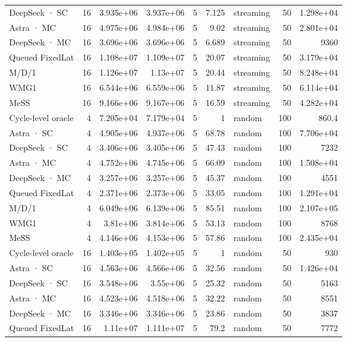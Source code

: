 \begin{tabular}{lrrrrrlrr}
DeepSeek · SC & 16 & 3.935e+06 & 3.937e+06 & 5 & 7.125 & streaming & 50 & 1.298e+04 \\
Astra · MC & 16 & 4.975e+06 & 4.984e+06 & 5 & 9.02 & streaming & 50 & 2.801e+04 \\
DeepSeek · MC & 16 & 3.696e+06 & 3.696e+06 & 5 & 6.689 & streaming & 50 & 9360 \\
Queued FixedLat & 16 & 1.108e+07 & 1.109e+07 & 5 & 20.07 & streaming & 50 & 3.179e+04 \\
M/D/1 & 16 & 1.126e+07 & 1.13e+07 & 5 & 20.44 & streaming & 50 & 8.248e+04 \\
WMG1 & 16 & 6.544e+06 & 6.559e+06 & 5 & 11.87 & streaming & 50 & 6.114e+04 \\
MeSS & 16 & 9.166e+06 & 9.167e+06 & 5 & 16.59 & streaming & 50 & 4.282e+04 \\
Cycle-level oracle & 4 & 7.205e+04 & 7.179e+04 & 5 & 1 & random & 100 & 860.4 \\
Astra · SC & 4 & 4.905e+06 & 4.937e+06 & 5 & 68.78 & random & 100 & 7.706e+04 \\
DeepSeek · SC & 4 & 3.406e+06 & 3.405e+06 & 5 & 47.43 & random & 100 & 7232 \\
Astra · MC & 4 & 4.752e+06 & 4.745e+06 & 5 & 66.09 & random & 100 & 1.508e+04 \\
DeepSeek · MC & 4 & 3.257e+06 & 3.257e+06 & 5 & 45.37 & random & 100 & 4551 \\
Queued FixedLat & 4 & 2.371e+06 & 2.373e+06 & 5 & 33.05 & random & 100 & 1.291e+04 \\
M/D/1 & 4 & 6.049e+06 & 6.139e+06 & 5 & 85.51 & random & 100 & 2.107e+05 \\
WMG1 & 4 & 3.81e+06 & 3.814e+06 & 5 & 53.13 & random & 100 & 8768 \\
MeSS & 4 & 4.146e+06 & 4.153e+06 & 5 & 57.86 & random & 100 & 2.435e+04 \\
Cycle-level oracle & 16 & 1.403e+05 & 1.402e+05 & 5 & 1 & random & 50 & 930 \\
Astra · SC & 16 & 4.563e+06 & 4.566e+06 & 5 & 32.56 & random & 50 & 1.426e+04 \\
DeepSeek · SC & 16 & 3.548e+06 & 3.55e+06 & 5 & 25.32 & random & 50 & 5163 \\
Astra · MC & 16 & 4.523e+06 & 4.518e+06 & 5 & 32.22 & random & 50 & 8551 \\
DeepSeek · MC & 16 & 3.346e+06 & 3.346e+06 & 5 & 23.86 & random & 50 & 3837 \\
Queued FixedLat & 16 & 1.11e+07 & 1.111e+07 & 5 & 79.2 & random & 50 & 7772 \\

\end{tabular}
